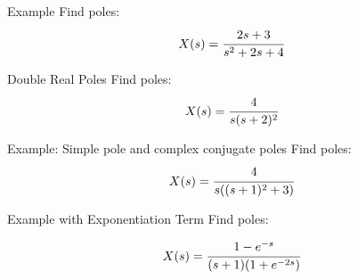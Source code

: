 \documentclass[aspectratio=169,xcolor=dvipsnames,svgnames,x11names,fleqn]{beamer}
\begin{document}
\begin{frame}{}
\vspace*{-9\baselineskip}
    \color{LightGray}{Blank space for calculation}
\end{frame}

\begin{frame}{Example}
 \vspace*{-6\baselineskip}
    Find poles:
    $$
    X(s) = \cfrac{2s + 3}{s^2 + 2s + 4}
    $$
\end{frame}

\begin{frame}{}
\vspace*{-9\baselineskip}
    \color{LightGray}{Blank space for calculation}
\end{frame}

\begin{frame}{Double Real Poles}
 \vspace*{-6\baselineskip}
    Find poles:
    $$
    X(s) = \cfrac{4}{s(s + 2)^2}
    $$
\end{frame}

\begin{frame}{}
\vspace*{-9\baselineskip}
    \color{LightGray}{Blank space for calculation}
\end{frame}

\begin{frame}{Example: Simple pole and complex conjugate poles}
 \vspace*{-6\baselineskip}
    Find poles:
    $$
    X(s) = \cfrac{4}{s ( (s+1)^2  + 3)}
    $$
\end{frame}


\begin{frame}{}
\vspace*{-9\baselineskip}
    \color{LightGray}{Blank space for calculation}
\end{frame}

\begin{frame}{Example with Exponentiation Term}
 \vspace*{-6\baselineskip}
    Find poles:

    $$
    X(s) = \cfrac{1- e^{-s}}{(s + 1) (1 + e^{-2s})}
    $$
\end{frame}

\begin{frame}{}
\vspace*{-9\baselineskip}
    \color{LightGray}{Blank space for calculation}
\end{frame}
\end{document}
